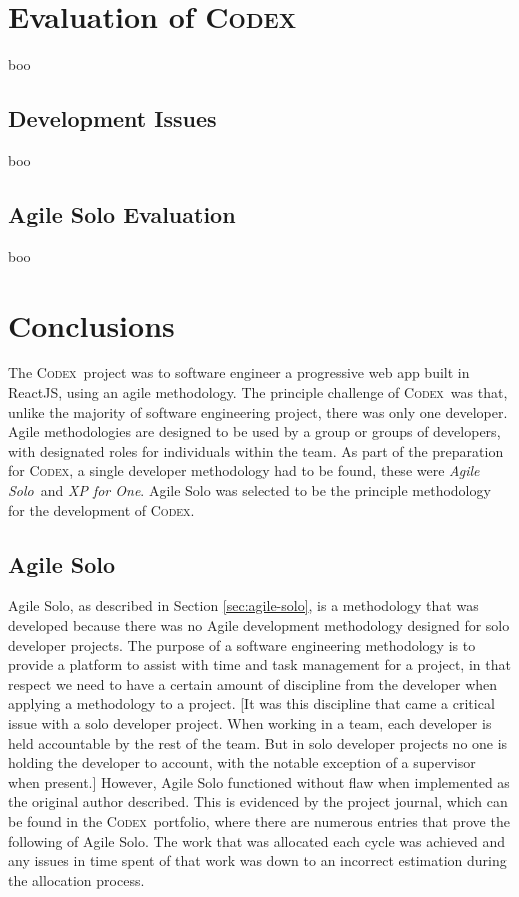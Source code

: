 \documentclass[final]{cmpreport}
\newcommand{\Codex}{\textsc{Codex}}
\newcommand{\AgileSolo}{\emph{Agile Solo}}
\begin{document}
	\section{Evaluation of \Codex} \label{sec:evaluation}
	boo
	
		\subsection{Development Issues} \label{sec:dev-eval}
		boo
			
		\subsection{Agile Solo Evaluation} \label{sec:agile-solo-eval}
		boo
			
	\section{Conclusions} \label{sec:conclusions}
	The \Codex \ project was to software engineer a progressive web app built in ReactJS, using an agile methodology. The principle challenge of \Codex \ was that, unlike the majority of software engineering project, there was only one developer. Agile methodologies are designed to be used by a group or groups of developers, with designated roles for individuals within the team. As part of the preparation for \Codex, a single developer methodology had to be found, these were \AgileSolo \ and \emph{XP for One}. Agile Solo was selected to be the principle methodology for the development of \Codex. 
	
		\subsection{Agile Solo} \label{sec:agile-solo-conc}
		Agile Solo, as described in Section \ref{sec:agile-solo}, is a methodology that was developed because there was no Agile development methodology designed for solo developer projects. The purpose of a software engineering methodology is to provide a platform to assist with time and task management for a project, in that respect we need to have a certain amount of discipline from the developer when applying a methodology to a project. [It was this discipline that came a critical issue with a solo developer project. When working in a team, each developer is held accountable by the rest of the team. But in solo developer projects no one is holding the developer to account, with the notable exception of a supervisor when present.] However, Agile Solo functioned without flaw when implemented as the original author described. This is evidenced by the project journal, which can be found in the \Codex \ portfolio, where there are numerous entries that prove the following of Agile Solo. The work that was allocated each cycle was achieved and any issues in time spent of that work was down to an incorrect estimation during the allocation process.
		
\end{document}
